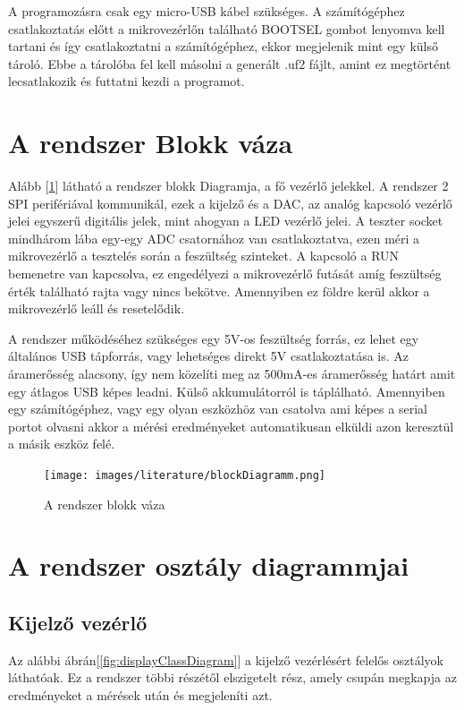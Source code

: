 A programozásra csak egy micro-USB kábel szükséges. A számítógéphez csatlakoztatás előtt
a mikrovezérlőn található BOOTSEL gombot lenyomva kell tartani és így csatlakoztatni a
számítógéphez, ekkor megjelenik mint egy külső tároló. Ebbe a tárolóba fel kell másolni
a generált .uf2 fájlt, amint ez megtörtént lecsatlakozik és futtatni kezdi a programot.

\section{A rendszer Blokk váza}

Alább [\ref{fig:blockDiagramm}] látható a rendszer blokk Diagramja, a fő vezérlő jelekkel.
A rendszer 2 SPI perifériával kommunikál, ezek a kijelző és a DAC, az analóg kapcsoló vezérlő jelei 
egyszerű digitális jelek, mint ahogyan a LED vezérlő jelei. A teszter socket mindhárom lába egy-egy ADC
csatornához van csatlakoztatva, ezen méri a mikrovezérlő a tesztelés során a feszültség szinteket.
A kapcsoló a RUN bemenetre van kapcsolva, ez engedélyezi a mikrovezérlő futását amíg feszültség érték 
található rajta vagy nincs bekötve. Amennyiben ez földre kerül akkor a mikrovezérlő leáll és resetelődik.

A rendszer működéséhez szükséges egy 5V-os feszültség forrás, ez lehet egy általános USB
tápforrás, vagy lehetséges direkt 5V csatlakoztatása is. Az áramerősség alacsony, így nem közelíti
meg az 500mA-es áramerősség határt amit egy átlagos USB képes leadni. Külső akkumulátorról
is táplálható. Amennyiben egy számítógéphez, vagy egy olyan eszközhöz van csatolva ami képes 
a serial portot olvasni akkor a mérési eredményeket automatikusan elküldi azon keresztül a 
másik eszköz felé. 


\begin{figure}[h]
    \centering
    \texttt{[image: images/literature/blockDiagramm.png]}
    \caption{A rendszer blokk váza}
    \label{fig:blockDiagramm}
\end{figure}

\section{A rendszer osztály diagrammjai}

\subsection{Kijelző vezérlő}

Az alábbi ábrán[\ref{fig:displayClassDiagram}] a kijelző vezérlésért felelős osztályok láthatóak.
Ez a rendszer többi részétől elszigetelt rész, amely csupán 
megkapja az eredményeket a mérések után és megjeleníti azt.



